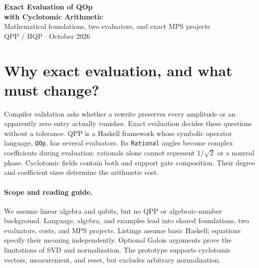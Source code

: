 \documentclass[11pt,a4paper]{article}
\newcommand{\code}[1]{\texttt{#1}}
\begin{document}
\begin{center}
{\LARGE\bfseries Exact Evaluation of QOp\\[3pt] with Cyclotomic Arithmetic}\\[8pt]
{\large Mathematical foundations, two evaluators, and exact MPS projects}\\[7pt]
{\small QPP / HQP \quad$\cdot$ October 2026}
\end{center}
\vspace{-5pt}
\begin{abstract}
\noindent Quantum Programming Playground (QPP) represents quantum operators
as symbolic programs whose angles are rational multiples of $\pi$.
Every valid finite expression has its entries in a computable cyclotomic
field. We derive this closure result and implement dense matrix and direct
statevector evaluation as two realizations of one semantics. Worked examples
connect syntax, coefficients, amplitudes, and probabilities. Exact matrix
product states need a different factorization: their amplitudes can remain
cyclotomic when their singular values cannot. We develop rank factorization
into a four-week HQP project and an MSc thesis proposal, with an independent
project on scalar efficiency. The prototype implements scalar arithmetic
and both evaluators, including measurement and reset through unnormalized
branches, with expected-value and randomized tests.
MPS remains proposed; no comparative performance claim is made.
\end{abstract}

\section{Why exact evaluation, and what must change?}
\label{sec:intro}
Compiler validation asks whether a rewrite preserves every amplitude or
an apparently zero entry actually vanishes. Exact evaluation decides these
questions without a tolerance. QPP is a Haskell framework whose symbolic
operator language, \code{QOp}, has several evaluators. Its \code{Rational}
angles become complex coefficients during evaluation: rationals alone
cannot represent $1/\sqrt2$ or a nonreal phase. Cyclotomic fields contain
both and support gate composition. Their degree and coefficient sizes
determine the arithmetic cost.

\paragraph{Scope and reading guide.}
We assume linear algebra and qubits, but no QPP or algebraic-number background.
Language, algebra, and examples lead into shared foundations, two evaluators,
costs, and MPS projects. Listings assume basic Haskell; equations specify their
meaning independently. Optional Galois arguments prove the limitations of SVD
and normalization. The prototype supports cyclotomic vectors, measurement,
and reset, but excludes arbitrary normalization.
\end{document}
